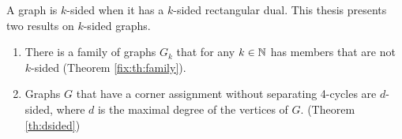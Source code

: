 
  A graph is $k$-sided when it has a $k$-sided rectangular dual. This thesis presents two results on $k$-sided graphs.

  \begin{enumerate}
    \item There is a family of graphs $G_k$ that for any $k \in \mathbb{N}$ has members that are not $k$-sided (Theorem \ref{fix:th:family}).
    \item Graphs $G$ that have a corner assignment without separating 4-cycles are $d$-sided, where $d$ is the maximal degree of the vertices of $G$. (Theorem \ref{th:dsided})
  \end{enumerate}

